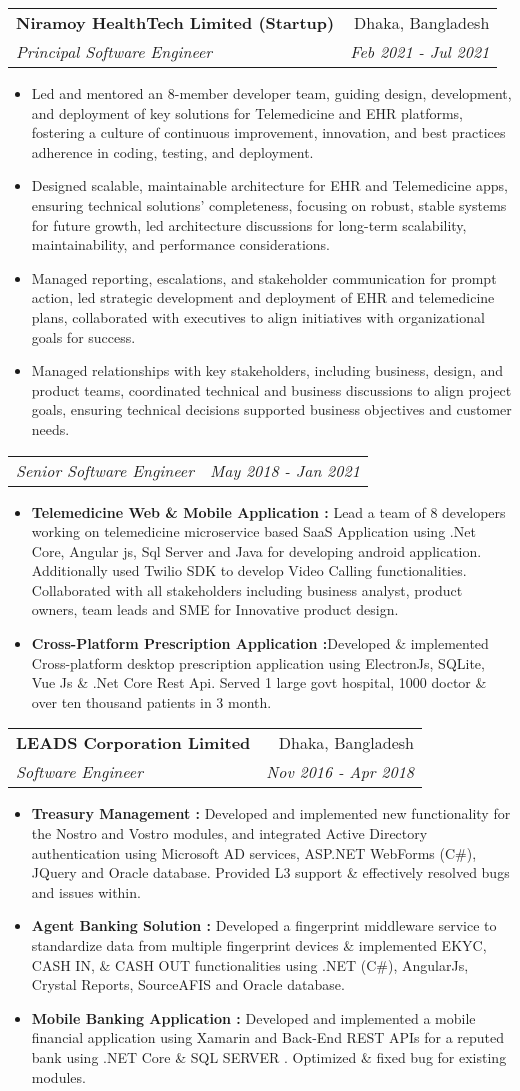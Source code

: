 \documentclass[letterpaper,11pt]{article}
\makeatletter
\newcommand{\resumeItem}[2]{
  \item\small{
    \textbf{#1}{#2 \vspace{-2pt}}
  }
}
\newcommand{\resumeSubheading}[4]{
  \vspace{-1pt}\item
    \begin{tabular*}{0.97\textwidth}[t]{l@{\extracolsep{\fill}}r}
      \textbf{#1} & #2 \\
      \textit{\small#3} & \textit{\small #4} \\
    \end{tabular*}\vspace{-5pt}
}
\newcommand{\resumeSubSubheading}[2]{
    \begin{tabular*}{0.97\textwidth}{l@{\extracolsep{\fill}}r}
      \textit{\small#1} & \textit{\small #2} \\
    \end{tabular*}\vspace{-5pt}
}
\newcommand{\resumeItemListStart}{\begin{itemize}}
\newcommand{\resumeItemListEnd}{\end{itemize}\vspace{-5pt}}
\makeatother
\begin{document}
   \resumeSubheading
      {Niramoy HealthTech Limited (Startup) }{Dhaka, Bangladesh}
      {Principal Software Engineer}{Feb 2021 - Jul 2021}
      \resumeItemListStart
        \resumeItem{}
          {Led and mentored an 8-member developer team, guiding design, development, and deployment of key solutions for Telemedicine and EHR platforms, fostering a culture of continuous improvement, innovation, and best practices adherence in coding, testing, and deployment.}
        \resumeItem{}
          {Designed scalable, maintainable architecture for EHR and Telemedicine apps, ensuring technical solutions' completeness, focusing on robust, stable systems for future growth, led architecture discussions for long-term scalability, maintainability, and performance considerations.}
        \resumeItem{}
          {Managed reporting, escalations, and stakeholder communication for prompt action, led strategic development and deployment of EHR and telemedicine plans, collaborated with executives to align initiatives with organizational goals for success.}    
      \resumeItem{}
          {Managed relationships with key stakeholders, including business, design, and product teams, coordinated technical and business discussions to align project goals, ensuring technical decisions supported business objectives and customer needs.}
      \resumeItemListEnd
      \resumeSubSubheading
      {Senior Software Engineer}{May 2018 - Jan 2021}
      \resumeItemListStart
        \resumeItem{Telemedicine Web \& Mobile Application : }
         {Lead a team of 8 developers working on telemedicine microservice based SaaS Application using .Net Core, Angular js, Sql Server and Java for developing android application. Additionally used Twilio SDK to develop Video Calling functionalities. Collaborated with all stakeholders including business analyst, product owners, team leads and
         SME for Innovative product design.}
        \resumeItem{Cross-Platform Prescription Application :}
         {Developed \& implemented Cross-platform desktop prescription application using ElectronJs, SQLite,  Vue Js \& .Net Core Rest Api. Served 1 large govt hospital, 1000 doctor \& over ten thousand patients in 3 month.}
    \resumeItemListEnd
    
    \resumeSubheading
      {LEADS Corporation Limited}{Dhaka, Bangladesh}
      {Software Engineer}{Nov 2016 - Apr 2018}
      \resumeItemListStart
      \resumeItem{Treasury Management : }
      {Developed and implemented new functionality for the Nostro and Vostro modules, and integrated Active Directory authentication using Microsoft AD services, ASP.NET WebForms (C\#), JQuery and Oracle database. Provided L3 support \& effectively resolved bugs and issues within.}
        \resumeItem{Agent Banking Solution : }
          {Developed a fingerprint middleware service to standardize data from multiple fingerprint devices \& implemented EKYC, CASH IN, \& CASH OUT functionalities using .NET (C\#), AngularJs, Crystal Reports, SourceAFIS and Oracle database.}
        \resumeItem{Mobile Banking Application : }
          {Developed and implemented a mobile financial application using Xamarin and  Back-End REST APIs for a reputed bank using .NET Core \& SQL SERVER . Optimized \& fixed bug for existing modules. }
      \resumeItemListEnd
\end{document}
